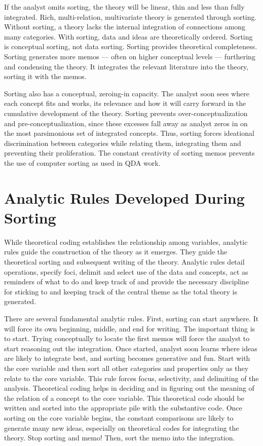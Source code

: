 If the analyst omits sorting, the theory will be linear, 
thin and less than fully integrated. 
Rich, multi-relation, multivariate theory is generated through sorting.
Without sorting, 
a theory lacks the internal integration of connections among many categories.
With sorting, data and ideas are theoretically ordered. 
Sorting is conceptual sorting, not data sorting. 
Sorting provides theoretical completeness. 
Sorting generates more memos
--- often on higher conceptual levels 
--- furthering and condensing the theory. 
It integrates the relevant literature into the theory, 
sorting it with the memos.

Sorting also has a conceptual, zeroing-in capacity. 
The analyst soon sees where each concept fits and works, 
its relevance and how it will carry forward in the cumulative development of the theory. 
Sorting prevents over-conceptualization and pre-conceptualization, 
since these excesses fall away as analyst zeros in on the most parsimonious set of integrated concepts. 
Thus, sorting forces ideational discrimination between categories while relating them, 
integrating them and preventing their proliferation. 
The constant creativity of sorting memos prevents the use of computer sorting as used in QDA work.

\section*{Analytic Rules Developed During Sorting}

While theoretical coding establishes the relationship among variables, analytic rules guide the construction of the theory as it emerges. 
They guide the theoretical sorting and subsequent writing of the theory. 
Analytic rules detail operations, 
specify foci, 
delimit and select use of the data and concepts, 
act as reminders of what to do and keep track of and provide the necessary discipline for sticking to and keeping track of the central theme as the total theory is generated.

There are several fundamental analytic rules. 
First, sorting can start anywhere. 
It will force its own beginning, middle, and end for writing. 
The important thing is to start. 
Trying conceptually to locate the first memos will force the analyst to start reasoning out the integration. 
Once started, 
analyst soon learns where ideas are likely to integrate best, and sorting becomes generative and fun. 
Start with the core variable and then sort all other categories and properties only as they relate to the core variable. 
This rule forces focus, selectivity, and delimiting of the analysis. 
Theoretical coding helps in deciding and in figuring out the meaning of
the relation of a concept to the core variable. 
This theoretical code should be written and sorted into the appropriate pile with the substantive code. 
Once sorting on the core variable begins, 
the constant comparisons are likely to generate many new ideas,
especially on theoretical codes for integrating the theory. 
Stop sorting and memo! 
Then, sort the memo into the integration.

